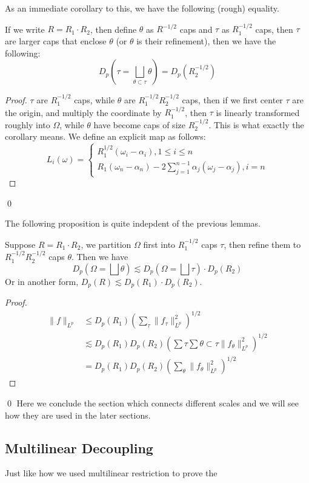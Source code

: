 As an immediate corollary to this, we have the following (rough) equality.
\begin{corollary}
    If we write $R=R_1\cdot R_2$, then define $\theta$ as $R^{-1/2}$ caps and $\tau$ as $R_1^{-1/2}$ caps, then $\tau$ are larger caps that enclose $\theta$ (or $\theta$ is their refinement), then we have the following:
    \begin{equation*}
        D_p(\tau=\bigsqcup_{\theta\subset\tau}\theta)=D_p(R_2^{-1/2})
    \end{equation*}
\end{corollary}
\begin{proof}
    $\tau$ are $R_1^{-1/2}$ caps, while $\theta$ are $R_1^{-1/2}R_2^{-1/2}$ caps, then if we first center $\tau$ are the origin, and multiply the coordinate by $R_1^{-1/2}$, then $\tau$ is linearly transformed roughly into $\Omega$, while $\theta$ have become caps of size $R_2^{-1/2}$. This is what exactly the corollary means. We define an explicit map as follows:
    \begin{equation*}
        L_i(\omega)=\begin{cases}
            R_1^{1/2}(\omega_i-\alpha_i), 1\leq i\leq n\\
            R_1(\omega_n-\alpha_n)-2\sum_{j=1}^{n-1}\alpha_j(\omega_j-\alpha_j), i=n
        \end{cases}
    \end{equation*}
\end{proof}
\qed

The following proposition is quite indepdent of the previous lemmas.
\begin{lemma}
    Suppose $R=R_1\cdot R_2$, we partition $\Omega$ first into $R_1^{-1/2}$ caps $\tau$, then refine them to $R_1^{-1/2}R_2^{-1/2}$ caps $\theta$. Then we have
    \begin{equation*}
        D_p(\Omega=\bigsqcup\theta)\lesssim D_p(\Omega=\bigsqcup\tau)\cdot D_p(R_2)
    \end{equation*}
    Or in another form, $D_p(R)\lesssim D_p(R_1)\cdot D_p(R_2)$.
\end{lemma}
\begin{proof}
    \begin{align*}
        \|f\|_{L^p}&\leq D_p(R_1)\left(\sum_\tau\|f_\tau\|_{L^p}^2 \right)^{1/2}\\
        &\lesssim D_p(R_1)D_p(R_2)\left(\sum\tau\sum{\theta\subset\tau}\|f_\theta\|_{L^p}^2 \right)^{1/2}\\
        &=D_p(R_1)D_p(R_2)\left(\sum_\theta\|f_\theta\|_{L^p}^2 \right)^{1/2}
    \end{align*}
\end{proof}
\qed
Here we conclude the section which connects different scales and we will see how they are used in the later sections.

\subsection*{Multilinear Decoupling}
Just like how we used multilinear restriction to prove the 